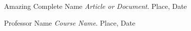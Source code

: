 \begin{thebibliography}{10}

        Amazing Complete Name
        \textit{Article or Document}. 
        Place, Date

    	Professor Name
        \textit{Course Name}. 
        Place, Date

\end{thebibliography}